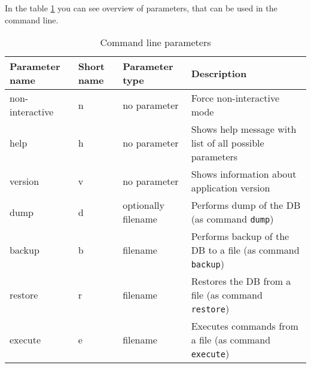 \documentclass[deska]{subfiles}
\begin{document}
In the table \ref{tab:cmdlineparams} you can see overview of parameters, that can be used in the command line.


\begin{longtable}{ l | l | l | p{7cm} }
    \caption{Command line parameters}
    \label{tab:cmdlineparams} \\
    Parameter name & Short name & Parameter type & Description \\
    \hline
    \endhead
    non-interactive & n & no parameter & Force non-interactive mode \\
    help & h & no parameter & Shows help message with list of all possible parameters \\
    version & v & no parameter & Shows information about application version \\
    dump & d & optionally filename & Performs dump of the DB (as command {\tt dump}) \\
    backup & b & filename & Performs backup of the DB to a file (as command {\tt backup}) \\
    restore & r & filename & Restores the DB from a file (as command {\tt restore}) \\
    execute & e & filename & Executes commands from a file (as command {\tt execute}) \\
    \hline
\end{longtable}
\end{document}
